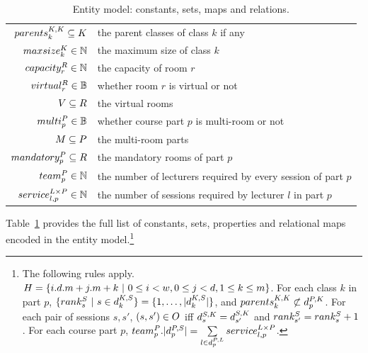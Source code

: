 \begin{table}[ht]
\begin{center}
\begin{tabular}{|rl|}
\\\hline
$parents^{K,K}_{k}\subseteq{K}$          & the parent classes of class $k$ if any
\\
$maxsize^{K}_{k}\in{\mathbb{N}}$            & the maximum size of class $k$
\\\hline
$capacity^{R}_{r}\in{\mathbb{N}}$             & the capacity of room $r$
\\
$virtual^{R}_{r}\in{\mathbb{B}}$              & whether room $r$ is virtual or not
\\
$V\subseteq{R}$             & the virtual rooms
\\\hline
$multi^{P}_{p}\in{\mathbb{B}}$            & whether course part $p$ is multi-room or not
\\
$M\subseteq{P}$           & the multi-room parts
\\
$mandatory^{P}_{p}\subseteq{R}$        & the mandatory rooms of part $p$
\\
$team^{P}_{p}\in{\mathbb{N}}$  & the number of lecturers required by every session of part $p$
\\
$service^{{L}\times{P}}_{l,p}\in{\mathbb{N}}$     & the number of sessions required by lecturer $l$ in part $p$
\\
\hline
\end{tabular}
\caption{Entity model: constants, sets, maps and relations.}
\label{table:model-maps}
\end{center}
\end{table}


Table~\ref{table:model-maps} provides the full list of constants, sets, properties and relational maps encoded in the entity model.\footnote{
The following rules apply. $\SLOT=\myset{i.\WEEKDAY.\DAILYSLOT+j.\DAILYSLOT+k\ |\ 0\leq i<\WEEK,0\leq j<\WEEKDAY,1\leq k\leq\DAILYSLOT}$.
For each class $k$ in part $p$,
$\myset{\sessionrank{s}\ |\ s\in\map{\CLASS}{\SESSION}{k}}=\myset{1,\ldots,\mycard{\map{\CLASS}{\SESSION}{k}}}$, 
and $parents^{K,K}_{k}\not\subset d^{P,K}_{p}$.
For each pair of sessions $s,s'$, 
$(s,s')\in O^{}_{}$ iff $d^{S,K}_{s}=d^{S,K}_{s'}$ and $rank^{S}_{s'}=rank^{S}_{s}+1$.
For each course part $p$,
$team^{P}_{p}.|d^{P,S}_{p}|=\sum\limits_{l\in d^{P,L}_{p}}{service^{{L}\times{P}}_{l,p}}$.}

